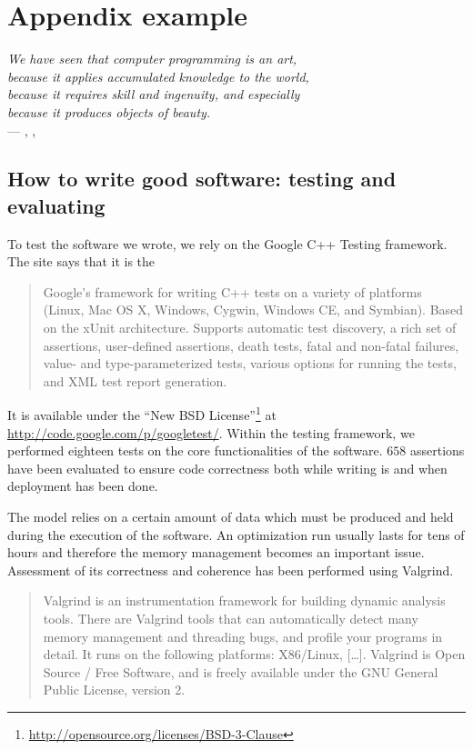 \chapter{Appendix example}

\begin{flushright}{\slshape    
    We have seen that computer programming is an art, \\ 
    because it applies accumulated knowledge to the world, \\ 
    because it requires skill and ingenuity, and especially \\
    because it produces objects of beauty.} \\ \medskip
    --- \citeauthor{knuth:1974}, ,
\citeyear{knuth:1974} 
\end{flushright}

\section{How to write good software: testing and evaluating}
To test the software we wrote, we rely on the Google \acs{C++}
Testing framework. The site says that it is
the \blockquote{Google's framework for writing \ac{C++} tests on a
variety of platforms (Linux, Mac OS X, Windows, Cygwin, Windows
CE, and Symbian). Based on the xUnit architecture. Supports
automatic test discovery, a rich set of assertions, user-defined
assertions, death tests, fatal and non-fatal failures, value- and
type-parameterized tests, various options for running the tests,
and \ac{XML} test report generation.} It is available under the
\enquote{New BSD
License}\footnote{\url{http://opensource.org/licenses/BSD-3-Clause}}
at \url{http://code.google.com/p/googletest/}. Within the testing
framework, we performed eighteen tests on the core functionalities
of the software. $658$ assertions have been evaluated to ensure
code correctness both while writing is and when deployment has
been done.

The model relies on a certain amount of data which must be
produced and held during the execution of the software. An
optimization run usually lasts for tens of hours and therefore the
memory management becomes an important issue. Assessment of its
correctness and coherence has been performed using Valgrind.
\blockquote{Valgrind is an instrumentation framework for building
dynamic analysis tools. There are Valgrind tools that can
automatically detect many memory management and threading bugs,
and profile your programs in detail. It runs on the following
platforms: X86/Linux, [\ldots]. Valgrind is Open Source / Free
Software, and is freely available under the GNU General Public
License, version 2.}

